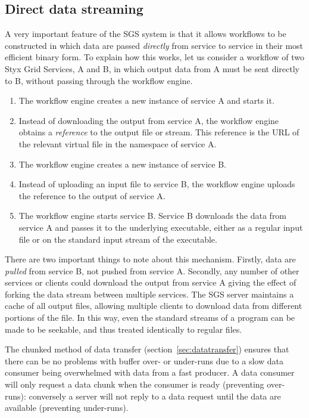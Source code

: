 \documentclass[a4paper]{article}
\begin{document}
\subsection{Direct data streaming}\label{sec:datapassing}
A very important feature of the SGS system is that it allows workflows to be constructed in which data are passed \textit{directly} from service to service in their most efficient binary form.  To explain how this works, let us consider a workflow of two Styx Grid Services, A and B, in which output data from A must be sent directly to B, without passing through the workflow engine.

\begin{enumerate}
\item The workflow engine creates a new instance of service A and starts it.
\item Instead of downloading the output from service A, the workflow engine obtains a \textit{reference} to the output file or stream.  This reference is the URL of the relevant virtual file in the namespace of service A.
\item The workflow engine creates a new instance of service B.
\item Instead of uploading an input file to service B, the workflow engine uploads the reference to the output of service A.
\item The workflow engine starts service B.  Service B downloads the data from service A and passes it to the underlying executable, either as a regular input file or on the standard input stream of the executable.
\end{enumerate}

There are two important things to note about this mechanism.  Firstly, data are \textit{pulled} from service B, not pushed from service A.  Secondly, any number of other services or clients could download the output from service A giving the effect of forking the data stream between multiple services.  The SGS server maintains a cache of all output files, allowing multiple clients to download data from different portions of the file.  In this way, even the standard streams of a program can be made to be seekable, and thus treated identically to regular files.

The chunked method of data transfer (section~\ref{sec:datatransfer}) ensures that there can be no problems with buffer over- or under-runs due to a slow data consumer being overwhelmed with data from a fast producer.  A data consumer will only request a data chunk when the consumer is ready (preventing over-runs): conversely a server will not reply to a data request until the data are available (preventing under-runs).
\end{document}
